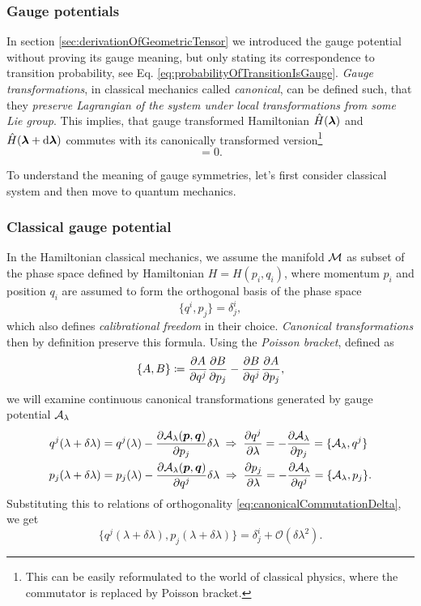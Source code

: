 \subsubsection{Gauge potentials}
In section \ref{sec:derivationOfGeometricTensor} we introduced the gauge potential without proving its gauge meaning, but only stating its correspondence to transition probability, see Eq. \ref{eq:probabilityOfTransitionIsGauge}.
\emph{Gauge transformations}, in classical mechanics called \emph{canonical}, can be defined such, that they \emph{preserve Lagrangian of the system under local transformations from some Lie group}. This implies, that gauge transformed Hamiltonian $\hat{H}({\bm\lambda})$ and $\hat{H}({\bm\lambda}+\mathrm{d} {\bm\lambda})$ commutes with its canonically transformed version\footnote{This can be easily reformulated to the world of classical physics, where the commutator is replaced by Poisson bracket.} 
 \begin{equation}
     [\HH(\llambda),\HH(\llambda+\delta \llambda)]=0.
 \end{equation}

 To understand the meaning of gauge symmetries, let's first consider classical system and then move to quantum mechanics.




\subsubsection{Classical gauge potential}
In the Hamiltonian classical mechanics, we assume the manifold $\mathcal{M}$ as subset of the phase space defined by Hamiltonian $H=H(p_i,q_i)$, where momentum $p_i$ and position $q_i$ are assumed to form the orthogonal basis of the phase space
\begin{equation}
    \{q^i,p_j\}=\delta^i_j,
    \label{eq:canonicalCommutationDelta}
\end{equation}
which also defines \emph{calibrational freedom} in their choice. \emph{Canonical transformations} then by definition preserve this formula. Using the \emph{Poisson bracket}, defined as
\begin{equation}
    \{A,B\}\coloneqq \frac{\partial A}{\partial q^j}\frac{\partial B}{\partial p_j}-\frac{\partial B}{\partial q^j}\frac{\partial A}{\partial p_j},
\end{equation}
we will examine continuous canonical transformations generated by gauge potential $\mathcal{A}_\lambda$
\begin{align}
        q^j(\lambda+\delta\lambda)&=q^j(\lambda)-\frac{\partial \mathcal{A}_\lambda(\bm{p},\bm{q})}{\partial p_j}\delta\lambda \;\Rightarrow\; \frac{\partial q^j}{\partial \lambda}=-\frac{\partial \mathcal{A}_\lambda}{\partial p_j}=\{\mathcal{A}_\lambda,q^j\}
        \label{eq:gaugeAsGeneratorOfMotion1}\\
        p_j(\lambda+\delta\lambda)&=p_j(\lambda)-\frac{\partial \mathcal{A}_\lambda(\bm{p},\bm{q})}{\partial q^j}\delta\lambda \;\Rightarrow\; \frac{\partial p_j}{\partial \lambda}=-\frac{\partial \mathcal{A}_\lambda}{\partial q^j}=\{\mathcal{A}_\lambda,p_j\}.
        \label{eq:gaugeAsGeneratorOfMotion2}
\end{align}
Substituting this to relations of orthogonality \ref{eq:canonicalCommutationDelta}, we get
\begin{equation}
    \{q^j(\lambda+\delta\lambda),p_j(\lambda+\delta\lambda)\}=\delta^i_j + \mathcal{O}(\delta\lambda^2).
\end{equation}
 
